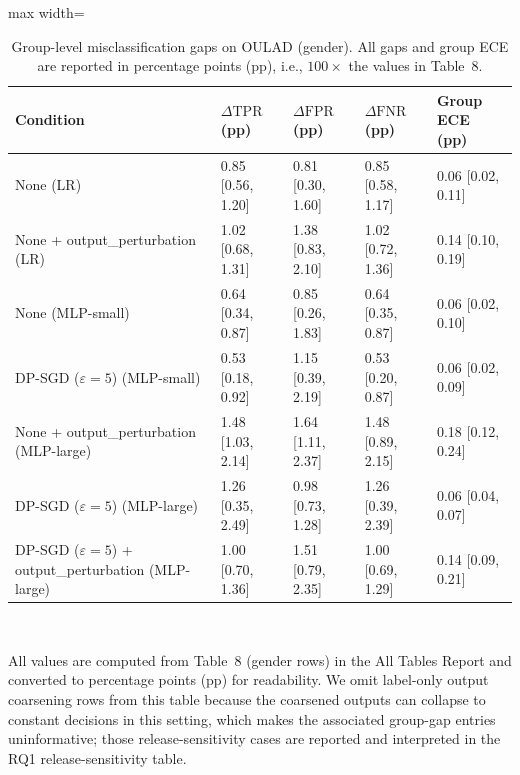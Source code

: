 \documentclass{edm_article}
\begin{document}
\begin{table}[t]
\centering
\caption{Group-level misclassification gaps on OULAD (gender). All gaps and group ECE are reported in percentage points (pp), i.e., $100\times$ the values in Table~8.}
\label{tab:rq2_group_gaps_gender}
\begin{threeparttable}
\begin{adjustbox}{max width=\linewidth}
\begin{tabular}{@{}l l l l l@{}}
\toprule
Condition & $\Delta\mathrm{TPR}$ (pp) & $\Delta\mathrm{FPR}$ (pp) & $\Delta\mathrm{FNR}$ (pp) & Group ECE (pp) \\
\midrule
None (LR) &
0.85 [0.56, 1.20] &
0.81 [0.30, 1.60] &
0.85 [0.58, 1.17] &
0.06 [0.02, 0.11] \\
None + output\_perturbation (LR) &
1.02 [0.68, 1.31] &
1.38 [0.83, 2.10] &
1.02 [0.72, 1.36] &
0.14 [0.10, 0.19] \\
None (MLP-small) &
0.64 [0.34, 0.87] &
0.85 [0.26, 1.83] &
0.64 [0.35, 0.87] &
0.06 [0.02, 0.10] \\
DP-SGD ($\varepsilon=5$) (MLP-small) &
0.53 [0.18, 0.92] &
1.15 [0.39, 2.19] &
0.53 [0.20, 0.87] &
0.06 [0.02, 0.09] \\
None + output\_perturbation (MLP-large) &
1.48 [1.03, 2.14] &
1.64 [1.11, 2.37] &
1.48 [0.89, 2.15] &
0.18 [0.12, 0.24] \\
DP-SGD ($\varepsilon=5$) (MLP-large) &
1.26 [0.35, 2.49] &
0.98 [0.73, 1.28] &
1.26 [0.39, 2.39] &
0.06 [0.04, 0.07] \\
DP-SGD ($\varepsilon=5$) + output\_perturbation (MLP-large) &
1.00 [0.70, 1.36] &
1.51 [0.79, 2.35] &
1.00 [0.69, 1.29] &
0.14 [0.09, 0.21] \\
\bottomrule
\end{tabular}
\end{adjustbox}
\\
\begin{flushleft}
\justifying
\footnotesize
All values are computed from Table~8 (gender rows) in the All Tables Report and converted to percentage points (pp) for readability. We omit label-only output coarsening rows from this table because the coarsened outputs can collapse to constant decisions in this setting, which makes the associated group-gap entries uninformative; those release-sensitivity cases are reported and interpreted in the RQ1 release-sensitivity table.
\end{flushleft}
\end{threeparttable}
\end{table}
\end{document}
